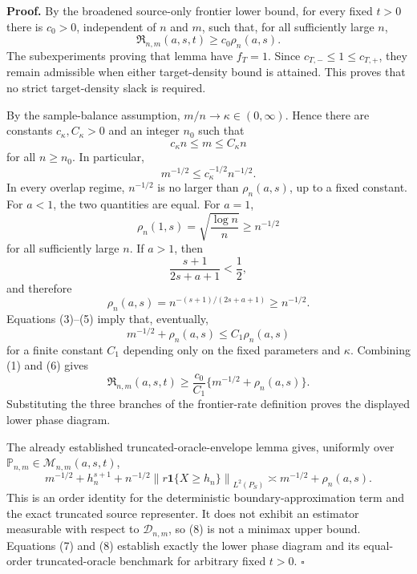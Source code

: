 \textbf{Proof.}
By the broadened source-only frontier lower bound, for every fixed \(t>0\) there is \(c_0>0\), independent of \(n\) and \(m\), such that, for all sufficiently large \(n\),
\[
 \mathfrak R_{n,m}(a,s,t)\ge c_0\rho_n(a,s).
\tag{1}
\]
The subexperiments proving that lemma have \(f_T=1\).  Since \(c_{T,-}\le1\le c_{T,+}\), they remain admissible when either target-density bound is attained.  This proves that no strict target-density slack is required.

By the sample-balance assumption, \(m/n\to\kappa\in(0,\infty)\).  Hence there are constants \(c_\kappa,C_\kappa>0\) and an integer \(n_0\) such that
\[
 c_\kappa n\le m\le C_\kappa n
\tag{2}
\]
for all \(n\ge n_0\).  In particular,
\[
 m^{-1/2}\le c_\kappa^{-1/2}n^{-1/2}.
\tag{3}
\]
In every overlap regime, \(n^{-1/2}\) is no larger than \(\rho_n(a,s)\), up to a fixed constant.  For \(a<1\), the two quantities are equal.  For \(a=1\),
\[
 \rho_n(1,s)=\sqrt{\frac{\log n}{n}}\ge n^{-1/2}
\tag{4}
\]
for all sufficiently large \(n\).  If \(a>1\), then
\[
 \frac{s+1}{2s+a+1}<\frac12,
\]
and therefore
\[
 \rho_n(a,s)=n^{-(s+1)/(2s+a+1)}\ge n^{-1/2}.
\tag{5}
\]
Equations (3)--(5) imply that, eventually,
\[
 m^{-1/2}+\rho_n(a,s)\le C_1\rho_n(a,s)
\tag{6}
\]
for a finite constant \(C_1\) depending only on the fixed parameters and \(\kappa\).  Combining (1) and (6) gives
\[
 \mathfrak R_{n,m}(a,s,t)
 \ge \frac{c_0}{C_1}\{m^{-1/2}+\rho_n(a,s)\}.
\tag{7}
\]
Substituting the three branches of the frontier-rate definition proves the displayed lower phase diagram.

The already established truncated-oracle-envelope lemma gives, uniformly over \(\mathbb P_{n,m}\in\mathcal M_{n,m}(a,s,t)\),
\[
 m^{-1/2}+h_n^{s+1}
 +n^{-1/2}\left\|r\mathbf 1\{X\ge h_n\}\right\|_{L^2(P_S)}
 \asymp m^{-1/2}+\rho_n(a,s).
\tag{8}
\]
This is an order identity for the deterministic boundary-approximation term and the exact truncated source representer.  It does not exhibit an estimator measurable with respect to \(\mathcal D_{n,m}\), so (8) is not a minimax upper bound.  Equations (7) and (8) establish exactly the lower phase diagram and its equal-order truncated-oracle benchmark for arbitrary fixed \(t>0\). \(\square\)